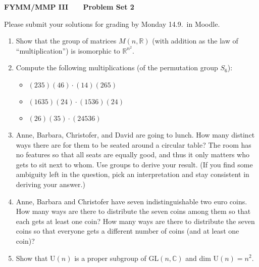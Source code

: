 \documentclass[12pt]{article}
\newcommand{\R} {\mathbb{R}}
\begin{document}
\normalsize

\baselineskip 14pt

\begin{center}
{\Large {\bf FYMM/MMP III \ \ \  Problem Set 2}}
\end{center}

\noindent
Please submit your solutions for grading by Monday 14.9.\ in Moodle.

\begin{enumerate}
\item Show that the group of matrices $M(n,\R)$ (with addition as the law of ``multiplication'') is isomorphic to $\R^{n^2}$.
\item Compute the following multiplications (of the permutation group $S_6$):
\begin{itemize}
\item $ (235)(46)\cdot(14)(265) $
\item $ (1635)(24)\cdot(1536)(24) $
\item $ (26)(35)\cdot(24536) $
\end{itemize} 
\item Anne, Barbara, Christofer, and David are going to lunch. How many distinct ways there are for them to be seated around a circular table?  The room has no features so that all seats are equally good, and thus  
it only matters who gets to sit next to whom. Use groups to derive
your result. (If you find some ambiguity left in the question, pick an interpretation and stay consistent in deriving your answer.)
\item Anne, Barbara and Christofer have seven indistinguishable two euro coins. How many ways are there to distribute the seven coins among them so that each gets
at least one coin? How many ways are there to distribute the seven coins so that everyone gets a different number of coins (and at least one coin)? 
\item Show that U$(n)$ is a proper subgroup of GL$(n, \mathbb{C})$ and dim U$(n) = n^2$.
\end{enumerate}
\end{document}
